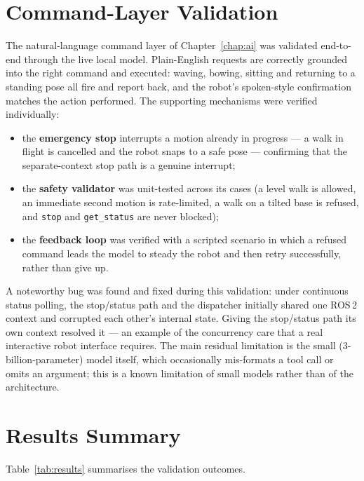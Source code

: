 \section{Command-Layer Validation}
\label{sec:val-ai}
The natural-language command layer of Chapter~\ref{chap:ai} was validated
end-to-end through the live local model. Plain-English requests are
correctly grounded into the right command and executed: waving, bowing,
sitting and returning to a standing pose all fire and report back, and the
robot's spoken-style confirmation matches the action performed. The
supporting mechanisms were verified individually:
\begin{itemize}[itemsep=2pt,topsep=4pt]
  \item the \textbf{emergency stop} interrupts a motion already in progress
        --- a walk in flight is cancelled and the robot snaps to a safe pose
        --- confirming that the separate-context stop path is a genuine
        interrupt;
  \item the \textbf{safety validator} was unit-tested across its cases (a
        level walk is allowed, an immediate second motion is rate-limited,
        a walk on a tilted base is refused, and \texttt{stop} and
        \texttt{get\_status} are never blocked);
  \item the \textbf{feedback loop} was verified with a scripted scenario in
        which a refused command leads the model to steady the robot and then
        retry successfully, rather than give up.
\end{itemize}
A noteworthy bug was found and fixed during this validation: under
continuous status polling, the stop/status path and the dispatcher
initially shared one ROS\,2 context and corrupted each other's internal
state. Giving the stop/status path its own context resolved it --- an
example of the concurrency care that a real interactive robot interface
requires. The main residual limitation is the small (3-billion-parameter)
model itself, which occasionally mis-formats a tool call or omits an
argument; this is a known limitation of small models rather than of the
architecture.

\section{Results Summary}
Table~\ref{tab:results} summarises the validation outcomes.

